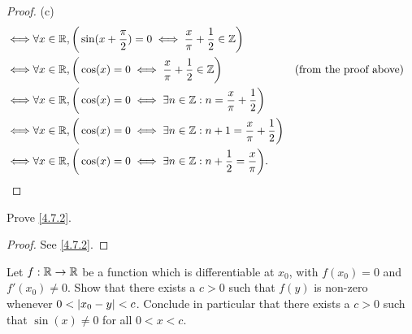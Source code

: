 \begin{proof}{(c)}
\begin{align*}
    \iff & \forall x \in \mathbb{R}, \bigg(\sin(x + \dfrac{\pi}{2}) = 0 \iff \dfrac{x}{\pi} + \dfrac{1}{2} \in \mathbb{Z}\bigg)                                       \\
    \iff & \forall x \in \mathbb{R}, \bigg(\cos(x) = 0 \iff \dfrac{x}{\pi} + \dfrac{1}{2} \in \mathbb{Z}\bigg)                     &  & \text{(from the proof above)} \\
    \iff & \forall x \in \mathbb{R}, \bigg(\cos(x) = 0 \iff \exists n \in \mathbb{Z} : n = \dfrac{x}{\pi} + \dfrac{1}{2}\bigg)                                        \\
    \iff & \forall x \in \mathbb{R}, \bigg(\cos(x) = 0 \iff \exists n \in \mathbb{Z} : n + 1 = \dfrac{x}{\pi} + \dfrac{1}{2}\bigg)                                    \\
    \iff & \forall x \in \mathbb{R}, \bigg(\cos(x) = 0 \iff \exists n \in \mathbb{Z} : n + \dfrac{1}{2} = \dfrac{x}{\pi}\bigg).
  \end{align*}
\end{proof}

\exercisesection

\begin{ex}\label{ex:4.7.1}
  Prove \cref{4.7.2}.
\end{ex}

\begin{proof}
  See \cref{4.7.2}.
\end{proof}

\begin{ex}\label{ex:4.7.2}
  Let \(f : \mathbb{R} \to \mathbb{R}\) be a function which is differentiable at \(x_0\), with \(f(x_0) = 0\) and \(f'(x_0) \neq 0\).
  Show that there exists a \(c > 0\) such that \(f(y)\) is non-zero whenever \(0 < \left\lvert x_0 - y\right\rvert < c\).
  Conclude in particular that there exists a \(c > 0\) such that \(\sin(x) \neq 0\) for all \(0 < x < c\).
\end{ex}

